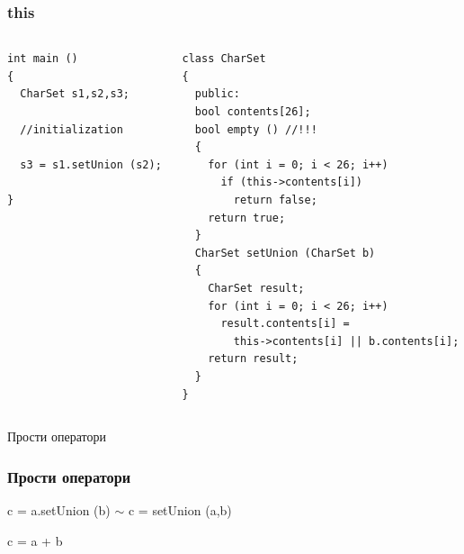 \documentclass{beamer}
\begin{document}
\begin{frame}[fragile]
\frametitle{this}


\begin{columns}[t]
  \begin{column}{0.5\textwidth}
\begin{flushleft}
\begin{lstlisting}
int main ()
{
  CharSet s1,s2,s3;

  //initialization

  s3 = s1.setUnion (s2);

}
\end{lstlisting}
\end{flushleft}
  \end{column}
  \begin{column}{0.5\textwidth}
\begin{flushleft}
\begin{lstlisting}
class CharSet
{
  public:
  bool contents[26];
  bool empty () //!!!
  {
    for (int i = 0; i < 26; i++)
      if (this->contents[i])
        return false;
    return true;
  }
  CharSet setUnion (CharSet b)
  {
    CharSet result;
    for (int i = 0; i < 26; i++)
      result.contents[i] =
        this->contents[i] || b.contents[i];
    return result;
  }
}
\end{lstlisting}
\end{flushleft}

  \end{column}
\end{columns}


\end{frame}


\begin{frame}
\centerline{Прости оператори}
\end{frame}

\begin{frame}[fragile]
\frametitle{Прости оператори}


\begin{center}
c = a.setUnion (b) $\sim$ c = setUnion (a,b)
\end{center}

\pause

\begin{center}
c = a + b
\end{center}

\end{frame}
\end{document}
